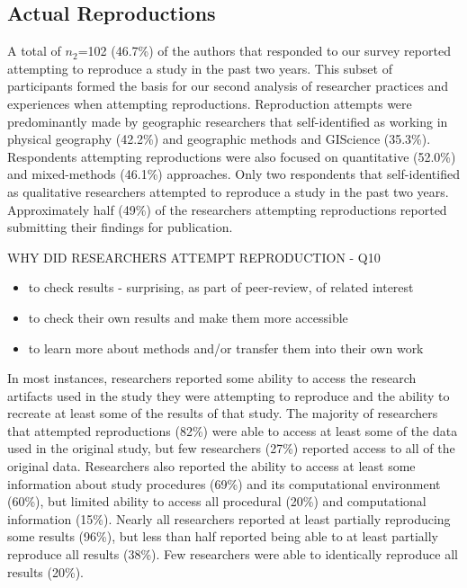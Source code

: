\documentclass[]{interact}
\theoremstyle{plain}%
\theoremstyle{definition}
\theoremstyle{remark}
\begin{document}
\subsection*{Actual Reproductions}
A total of \textit{$n_{2}$}=102 (46.7\%) of the authors that responded to our survey reported attempting to reproduce a study in the past two years.
This subset of participants formed the basis for our second analysis of researcher practices and experiences when attempting reproductions.
Reproduction attempts were predominantly made by geographic researchers that self-identified as working in physical geography (42.2\%) and geographic methods and GIScience (35.3\%).
Respondents attempting reproductions were also focused on quantitative (52.0\%) and mixed-methods (46.1\%) approaches. 
Only two respondents that self-identified as qualitative researchers attempted to reproduce a study in the past two years.
Approximately half (49\%) of the researchers attempting reproductions reported submitting their findings for publication.

WHY DID RESEARCHERS ATTEMPT REPRODUCTION - Q10
\begin{itemize}
    \item to check results - surprising, as part of peer-review, of related interest
    \item to check their own results and make them more accessible
    \item to learn more about methods and/or transfer them into their own work
\end{itemize}

In most instances, researchers reported some ability to access the research artifacts used in the study they were attempting to reproduce and the ability to recreate at least some of the results of that study.  
The majority of researchers that attempted reproductions (82\%) were able to access at least some of the data used in the original study, but few researchers (27\%) reported access to all of the original data.
Researchers also reported the ability to access at least some information about study procedures (69\%) and its computational environment (60\%), but limited ability to access all procedural (20\%) and computational information (15\%). 
Nearly all researchers reported at least partially reproducing some results (96\%), but less than half reported being able to at least partially reproduce all results (38\%).
Few researchers were able to identically reproduce all results (20\%).  
\end{document}

